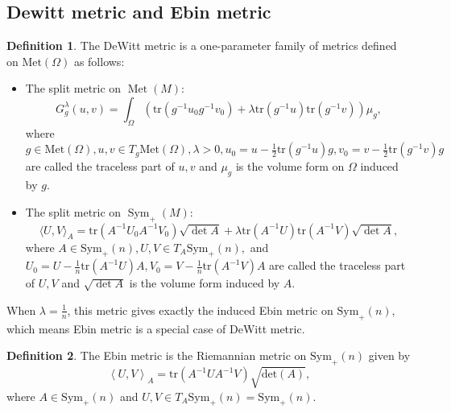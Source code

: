 \documentclass{article}
\theoremstyle{definition}
\newtheorem{definition}{Definition}
\theoremstyle{plain}
\begin{document}
\subsection{Dewitt metric and Ebin metric}
\begin{definition}
The DeWitt metric is a one-parameter family of metrics defined on $\mathrm{Met}(\Omega)$ as follows:
\begin{itemize}
    \item The split metric on $\operatorname{Met}(M)$:
    \begin{equation*}
    G^\lambda_g(u,v)=\int_\Omega\left(\mathrm{tr}(g^{-1}u_0g^{-1}v_0)+\lambda\mathrm{tr}(g^{-1}u)\mathrm{tr}(g^{-1}v)\right)\mu_g,
    \end{equation*}where $g\in\mathrm{Met}(\Omega), u,v\in T_g\mathrm{Met}(\Omega), \lambda>0, u_0=u-\frac{1}{2}\mathrm{tr}(g^{-1}u)g, v_0=v-\frac{1}{2}\mathrm{tr}(g^{-1}v)g$ are called the traceless part of $u,v$ and $\mu_g$ is the volume form on $\Omega$ induced by $g$.
    \item The split metric on $\operatorname{Sym}_+(M)$:
    \begin{equation*}
    \langle U,V\rangle_A=\mathrm{tr}(A^{-1}U_0A^{-1}V_0)\sqrt{\det A}+\lambda\mathrm{tr}(A^{-1}U)\mathrm{tr}(A^{-1}V)\sqrt{\det A},
    \end{equation*}
    where $A\in\mathrm{Sym}_+(n), U,V\in T_A\mathrm{Sym}_+(n),$ and $U_0=U-\frac{1}{n}\mathrm{tr}(A^{-1}U)A,  V_0=V-\frac{1}{n}\mathrm{tr}(A^{-1}V)A$ are called the traceless part of $U,V$ and $\sqrt{\det A}$ is the volume form induced by $A$.
\end{itemize}
\end{definition}

When $\lambda=\frac{1}{n}$, this metric gives exactly the induced Ebin metric on $\mathrm{Sym}_+(n)$, which means Ebin metric is a special case of DeWitt metric.

\begin{definition}
The Ebin metric is the Riemannian metric on $\mathrm{Sym}_+(n)$ given by
\begin{equation*}
    \left<U,V\right>_A=\mathrm{tr}(A^{-1}UA^{-1}V)\sqrt{\mathrm{det}(A)},
\end{equation*}
where $A\in\mathrm{Sym}_+(n)$ and $U,V\in T_A\mathrm{Sym}_+(n)=\mathrm{Sym}_+(n)$.
\end{definition}
\end{document}
